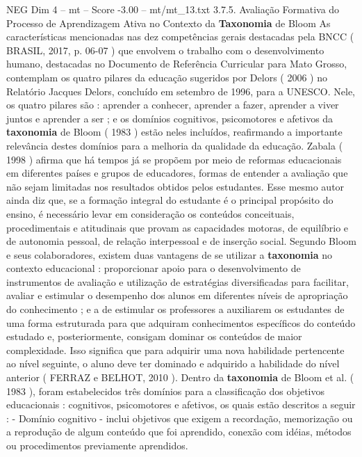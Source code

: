 \begin{textsample}{NEG Dim 4 – mt – Score -3.00 – mt/mt\_13.txt}  \label{ex:f4_neg_114}
3.7.5.
Avaliação Formativa do Processo de Aprendizagem Ativa no Contexto da \textbf{Taxonomia} de Bloom As características mencionadas nas dez competências gerais destacadas pela BNCC ( BRASIL, 2017, p. 06-07 ) que envolvem o trabalho com o desenvolvimento humano, destacadas no Documento de Referência Curricular para Mato Grosso, contemplam os quatro pilares da educação sugeridos por Delors ( 2006 ) no Relatório Jacques Delors, concluído em setembro de 1996, para a UNESCO.
Nele, os quatro pilares são : aprender a conhecer, aprender a fazer, aprender a viver juntos e aprender a ser ; e os domínios cognitivos, psicomotores e afetivos da \textbf{taxonomia} de Bloom ( 1983 ) estão neles incluídos, reafirmando a importante relevância destes domínios para a melhoria da qualidade da educação.
Zabala ( 1998 ) afirma que há tempos já se propõem por meio de reformas educacionais em diferentes países e grupos de educadores, formas de entender a avaliação que não sejam limitadas nos resultados obtidos pelos estudantes.
Esse mesmo autor ainda diz que, se a formação integral do estudante é o principal propósito do ensino, é necessário levar em consideração os conteúdos conceituais, procedimentais e atitudinais que provam as capacidades motoras, de equilíbrio e de autonomia pessoal, de relação interpessoal e de inserção social.
Segundo Bloom e seus colaboradores, existem duas vantagens de se utilizar a \textbf{taxonomia} no contexto educacional : proporcionar apoio para o desenvolvimento de instrumentos de avaliação e utilização de estratégias diversificadas para facilitar, avaliar e estimular o desempenho dos alunos em diferentes níveis de apropriação do conhecimento ; e a de estimular os professores a auxiliarem os estudantes de uma forma estruturada para que adquiram conhecimentos específicos do conteúdo estudado e, posteriormente, consigam dominar os conteúdos de maior complexidade.
Isso significa que para adquirir uma nova habilidade pertencente ao nível seguinte, o aluno deve ter dominado e adquirido a habilidade do nível anterior ( FERRAZ e BELHOT, 2010 ).
Dentro da \textbf{taxonomia} de Bloom et al. ( 1983 ), foram estabelecidos três domínios para a classificação dos objetivos educacionais : cognitivos, psicomotores e afetivos, os quais estão descritos a seguir : - Domínio cognitivo - inclui objetivos que exigem a recordação, memorização ou a reprodução de algum conteúdo que foi aprendido, conexão com idéias, métodos ou procedimentos previamente aprendidos.

\end{textsample}
